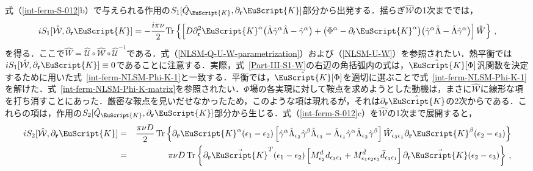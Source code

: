 \documentclass[a4paper,11pt]{ltjsarticle}
\def\Tr{\mathrm{Tr}}
\def\Qk{\hat{Q}_{\EuScript{K}}}
\begin{document}
式（\ref{int-ferm-S-012}b）で与えられる作用の$S_{1}[\hat
Q_{\EuScript{K}},\partial_{\mathbf{r}}\EuScript{K}]$部分から出発する．揺らぎ$\hat{\mathcal{W}}$の1次まででは，
\begin{equation}\label{Part-III-S1-W}
iS_{1}[\hat{\mathcal{W}},\partial_{\mathbf{r}}\EuScript{K}]=
-\frac{i\pi\nu}{2}\Tr\left\{\left[D\partial^{2}_{\mathbf{r}}\EuScript{K}^{\alpha}
\big(\hat{\Lambda}\hat{\gamma}^{\alpha}\hat{\Lambda}-\hat{\gamma}^{\alpha}\big)
+\big(\Phi^{\alpha}-\partial_{t}\EuScript{K}^{\alpha}\big)
\big(\hat{\gamma}^{\alpha}\hat{\Lambda}-\hat{\Lambda}\hat{\gamma}^{\alpha}\big)\right]
\hat{W}\right\}\,,
\end{equation}
を得る．ここで$\hat{W}=\hat{\mathcal{U}}\circ\hat{\mathcal{W}}\circ\hat{\mathcal{U}}^{-1}$である．式（\ref{NLSM-Q-U-W-parametrization}）および（\ref{NLSM-U-W}）を参照されたい．熱平衡では$iS_{1}[\hat{\mathcal{W}},\partial_{\mathbf{r}}\EuScript{K}]\equiv0$であることに注意する．実際，式~\eqref{Part-III-S1-W}の右辺の角括弧内の式は，$\hat{\EuScript{K}}[\Phi]$汎関数を決定するために用いた式~\eqref{int-ferm-NLSM-Phi-K-1}と一致する．平衡では，$\hat{\EuScript{K}}[\Phi]$を適切に選ぶことで式~\eqref{int-ferm-NLSM-Phi-K-1}を解けた．式~\eqref{int-ferm-NLSM-Phi-K-matrix}を参照されたい．$\hat{\Phi}$場の各実現に対して鞍点を求めようとした動機は，まさに$\hat{\mathcal{W}}$に線形な項を打ち消すことにあった．厳密な鞍点を見いだせなかったため，このような項は現れるが，それは$\partial_{\mathbf{r}}\hat{\EuScript{K}}$の2次からである．これらの項は，作用の$S_{2}[\Qk,\partial_{\mathbf{r}}\EuScript{K}]$部分から生じる．式（\ref{int-ferm-S-012}c）を$\hat{\mathcal{W}}$の1次まで展開すると，
\begin{eqnarray}\label{Part-III-S2-W}
iS_{2}[\hat{\mathcal{W}},\partial_{\mathbf{r}}\EuScript{K}] &=& \frac{\pi\nu D}{2}\,
\Tr\left\{\partial_{\mathbf{r}}\EuScript{K}^{\alpha}(\epsilon_{1}-\epsilon_{2})
\left[\hat{\gamma}^{\alpha}\hat{\Lambda}_{\epsilon_{2}}
\hat{\gamma}^{\beta}\hat{\Lambda}_{\epsilon_{3}}-
\hat{\Lambda}_{\epsilon_{1}}\hat{\gamma}^{\alpha}
\hat{\Lambda}_{\epsilon_{2}}\hat{\gamma}^{\beta}\right]
\hat{W}_{\epsilon_{3}\epsilon_{1}}
\partial_{\mathbf{r}}\EuScript{K}^{\beta}(\epsilon_{2}-\epsilon_{3})\right\}
\nonumber  \\
&=& \pi\nu D\,
\Tr\left\{\partial_{\mathbf{r}}\vec{\EuScript{K}}^{T}(\epsilon_{1}-\epsilon_{2})
\left[M^{d}_{\epsilon_{2}}d_{\epsilon_{3}\epsilon_{1}}+
M^{\bar{d}}_{\epsilon_{1}\epsilon_{2}\epsilon_{3}}
\bar{d}_{\epsilon_{3}\epsilon_{1}}\right]
\partial_{\mathbf{r}}\vec{\EuScript{K}}(\epsilon_{2}-\epsilon_{3})\right\}\,,
\end{eqnarray}
\end{document}
